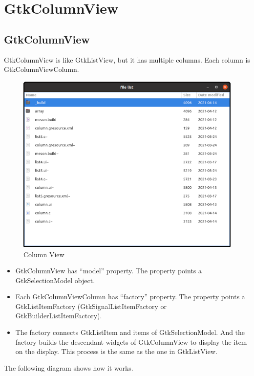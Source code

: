\section{GtkColumnView}\label{gtkcolumnview}

\subsection{GtkColumnView}\label{gtkcolumnview-1}

GtkColumnView is like GtkListView, but it has multiple columns. Each
column is GtkColumnViewColumn.

\begin{figure}
\centering
\includegraphics[width=11.3cm,height=9cm]{../image/column_view.png}
\caption{Column View}
\end{figure}

\begin{itemize}
\tightlist
\item
  GtkColumnView has ``model'' property. The property points a
  GtkSelectionModel object.
\item
  Each GtkColumnViewColumn has ``factory'' property. The property points
  a GtkListItemFactory (GtkSignalListItemFactory or
  GtkBuilderListItemFactory).
\item
  The factory connects GtkListItem and items of GtkSelectionModel. And
  the factory builds the descendant widgets of GtkColumnView to display
  the item on the display. This process is the same as the one in
  GtkListView.
\end{itemize}

The following diagram shows how it works.

